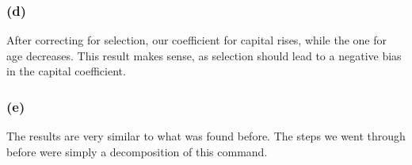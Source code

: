 \documentclass[11pt]{article}
\begin{document}
\subsubsection*{(d)}


\FloatBarrier
After correcting for selection, our coefficient for capital rises, while the one for age decreases. 
This result makes sense, as selection should lead to a negative bias in the capital coefficient. 

\subsubsection*{(e)}

\FloatBarrier

The results are very similar to what was found before. The steps we went through before were simply a decomposition of this command.  
\end{document}
